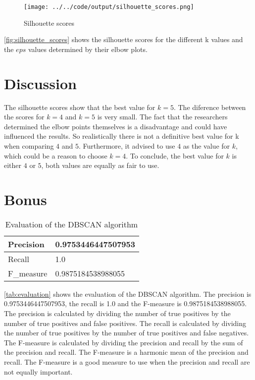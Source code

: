 \documentclass[twoside, a4paper, fleqn, reqno]{article}
\begin{document}
\begin {figure}[H]
	\centering
	\texttt{[image: ../../code/output/silhouette\_scores.png]}
	\caption{Silhouette scores}
	\label{fig:silhouette_scores}
\end {figure}

\autoref{fig:silhouette_scores} shows the silhouette scores for the different k values
and the $eps$ values determined by their elbow plots.

\section{Discussion}

The silhouette scores show that the best value for $k=5$. The diference between the scores for
$k=4$ and $k=5$ is very small.
The fact that the researchers determined the elbow points themselves is a disadvantage
and could have influenced the results.
So realistically there is not a definitive best value for k when comparing $4$ and $5$.
Furthermore, it advised to use $4$ as the value for $k$, which could be a reason to choose $k=4$.
To conclude, the best value for $k$ is either $4$ or $5$, both values are equally as fair to use.

\section*{Bonus}

\begin{table}[H]
	\begin{tabular}{|l|l|}
	\hline
	Precision  & 0.9753446447507953 \\ \hline
	Recall     & 1.0                \\ \hline
	F\_measure & 0.9875184538988055 \\ \hline
	\end{tabular}
	\caption{Evaluation of the DBSCAN algorithm}
	\label{tab:evaluation}
\end{table}

\autoref{tab:evaluation} shows the evaluation of the DBSCAN algorithm.
The precision is 0.9753446447507953, the recall is 1.0 and the F-measure is 0.9875184538988055.
The precision is calculated by dividing the number of true positives by the number of true positives and false positives.
The recall is calculated by dividing the number of true positives by the number of true positives and false negatives.
The F-measure is calculated by dividing the precision and recall by the sum of the precision and recall.
The F-measure is a harmonic mean of the precision and recall.
The F-measure is a good measure to use when the precision and recall are not equally important.
\end{document}
